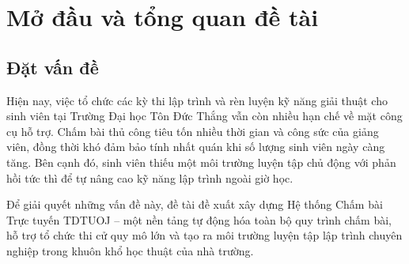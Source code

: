 \documentclass[12pt, a4paper]{report}
\begin{document}
\begin{acronym}[XXXXXXXX]
\end{acronym}
\newpage

\setcounter{page}{1}

\chapter{Mở đầu và tổng quan đề tài}

\section{Đặt vấn đề}

Hiện nay, việc tổ chức các kỳ thi lập trình và rèn luyện kỹ năng giải thuật cho sinh viên tại Trường Đại học Tôn Đức Thắng vẫn còn nhiều hạn chế về mặt công cụ hỗ trợ. Chấm bài thủ công tiêu tốn nhiều thời gian và công sức của giảng viên, đồng thời khó đảm bảo tính nhất quán khi số lượng sinh viên ngày càng tăng. Bên cạnh đó, sinh viên thiếu một môi trường luyện tập chủ động với phản hồi tức thì để tự nâng cao kỹ năng lập trình ngoài giờ học.

Để giải quyết những vấn đề này, đề tài đề xuất xây dựng Hệ thống Chấm bài Trực tuyến TDTUOJ -- một nền tảng tự động hóa toàn bộ quy trình chấm bài, hỗ trợ tổ chức thi cử quy mô lớn và tạo ra môi trường luyện tập lập trình chuyên nghiệp trong khuôn khổ học thuật của nhà trường.
\end{document}
